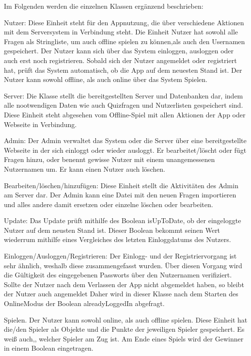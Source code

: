 \documentclass[fontsize=12pt,paper=a4,twoside]{scrartcl}
\begin{document}
Im Folgenden werden die einzelnen Klassen ergänzend beschrieben:

Nutzer:
Diese Einheit steht für den Appnutzung, die über verschiedene Aktionen
mit dem Serversystem in Verbindung steht. Die Einheit Nutzer hat sowohl 
alle Fragen als Stringliste, um auch offline spielen zu können,als auch 
den Usernamen gespeichert. 
Der Nutzer kann sich über das System einloggen, ausloggen oder auch erst noch 
registrieren.
Sobald sich der Nutzer angemeldet oder registriert hat, prüft das System automatisch,
ob die App auf dem neuesten Stand ist. Der Nutzer kann sowohl offline, als auch online 
über das System Spielen.

Server:
Die Klasse stellt die bereitgestellten Server und Datenbanken dar, indem alle 
nootwendigen Daten wie auch Quizfragen und Nutzerlisten gespeichert sind. Diese Einheit
steht abgesehen vom Offline-Spiel mit allen Aktionen der App oder Webseite in Verbindung.

Admin: 
Der Admin verwaltet das System oder die Server über eine bereitgestellte Webseite in der
sich einloggt oder wieder ausloggt. Er bearbeitet/löscht oder fügt Fragen hinzu, oder 
benennt gewisse Nutzer mit einem unangemessenen Nutzernamen um. Er kann einen Nutzer auch
löschen.

Bearbeiten/löschen/hinzufügen:
Diese Einheit stellt die Aktivitäten des Admin am Server dar. Der Admin kann eine Datei 
mit den neuen Fragen importieren und alles andere damit ersetzen oder einzelne löschen 
oder bearbeiten.

Update:
Das Update prüft mithilfe des Boolean isUpToDate, ob der eingeloggte Nutzer auf dem neusten Stand ist.
Dieser Boolean bekommt seinen Wert wiederrum mithilfe eines Vergleiches des letzten Einloggdatums des
Nutzers.

Einloggen/Ausloggen/Registrieren:
Der Einlogg- und der Registriervorgang ist sehr ähnlich, weshalb diese zusammengefasst wurden. 
Über diesen Vorgang wird die Gültigkeit des eingegebenen Passworts über den Nutzernamen verifiziert.
Sollte der Nutzer nach dem Verlassen der App nicht abgemeldet haben, so bleibt der Nutzer auch angemeldet
Daher wird in dieser Klasse nach dem Starten des OnlineModus der Boolean alreadyLoggedIn abgefragt.

Spielen.
Der Nutzer kann sowohl online, als auch offline spielen. Diese Einheit hat die/den Spieler
als Objekte und die Punkte der jeweiligen Spieler gespeichert. Es weiß auch,, welcher Spieler am Zug ist.
Am Ende eines Spiels wird der Gewinner in einem Boolean eingetragen.
\end{document}
